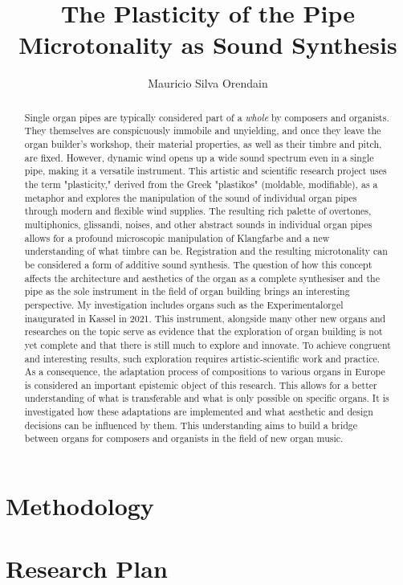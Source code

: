 \documentclass[11pt, oneside]{report}
\title{The Plasticity of the Pipe \\
  \large Microtonality as Sound Synthesis \\
    }
\author{Mauricio Silva Orendain}
\begin{document}
\maketitle



\begin{abstract}
Single organ pipes are typically considered part of a \textit{whole} by composers and organists. They themselves are conspicuously immobile and unyielding, and once they leave the organ builder's workshop, their material properties, as well as their timbre and pitch, are fixed. However, dynamic wind opens up a wide sound spectrum even in a single pipe, making it a versatile instrument. This artistic and scientific research project uses the term "plasticity," derived from the Greek "plastikos" (moldable, modifiable), as a metaphor and explores the manipulation of the sound of individual organ pipes through modern and flexible wind supplies. The resulting rich palette of overtones, multiphonics, glissandi, noises, and other abstract sounds in individual organ pipes allows for a profound microscopic manipulation of Klangfarbe and a new understanding of what timbre can be. Registration and the resulting microtonality can be considered a form of additive sound synthesis. The question of how this concept affects the architecture and aesthetics of the organ as a complete synthesiser and the pipe as the sole instrument in the field of organ building brings an interesting perspective. My investigation includes organs such as the Experimentalorgel inaugurated in Kassel in 2021. This instrument, alongside many other new organs and researches on the topic serve as evidence that the exploration of organ building is not yet complete and that there is still much to explore and innovate. To achieve congruent and interesting results, such exploration requires artistic-scientific work and practice. As a consequence, the adaptation process of compositions to various organs in Europe is considered an important epistemic object of this research. This allows for a better understanding of what is transferable and what is only possible on specific organs. It is investigated how these adaptations are implemented and what aesthetic and design decisions can be influenced by them. This understanding aims to build a bridge between organs for composers and organists in the field of new organ music.
\end{abstract}

\tableofcontents

\chapter{Methodology}



\chapter{Research Plan}

\end{document}
